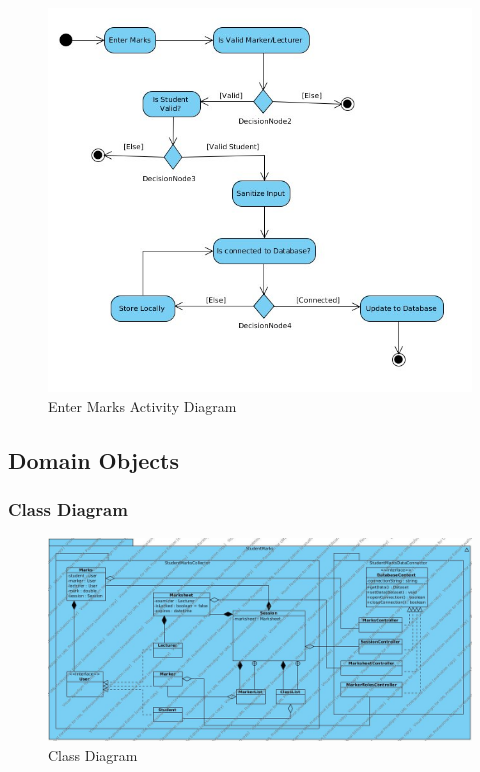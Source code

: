 \documentclass[a4paper]{article}
\begin{document}
			\begin{figure}[H]
				\centering
				\includegraphics[width=1\textwidth]{EnterMarksActivityDiagram}
				\caption{Enter Marks Activity Diagram}
			\end{figure}

		\subsection{Domain Objects}
		
			\subsubsection{Class Diagram}
			
			\begin{figure}[H]
				\includegraphics[width=1\textwidth]{StudentMarksClassDiagram}
				\caption{Class Diagram}
			\end{figure}
\end{document}
